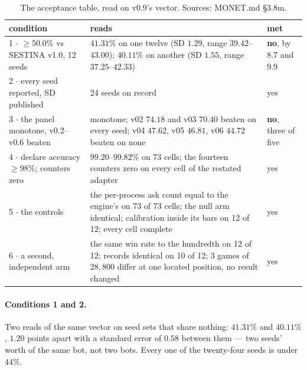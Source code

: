 \documentclass[11pt]{article}
\newcommand{\monet}{MONET.md}
\begin{document}
\begin{table}[t]
\centering\small
\caption{The acceptance table, read on v0.9's vector. Sources: \monet{} \S3.8m.}
\label{tab:accept}
\begin{tabular}{@{}p{}p{}l@{}}
\toprule
condition & reads & met \\
\midrule
1 $\cdot$ $\geq 50.0\%$ vs SESTINA v1.0, 12 seeds & $41.31\%$ on one twelve (SD $1.29$, range $39.42$--$43.00$); $40.11\%$ on another (SD $1.55$, range $37.25$--$42.33$) & \textbf{no}, by 8.7 and 9.9 \\
2 $\cdot$ every seed reported, SD published & 24 seeds on record & yes \\
3 $\cdot$ the panel monotone, v0.2--v0.6 beaten & monotone; v02 $74.18$ and v03 $70.40$ beaten on every seed; v04 $47.62$, v05 $46.81$, v06 $44.72$ beaten on none & \textbf{no}, three of five \\
4 $\cdot$ declare accuracy $\geq 98\%$; counters zero & $99.20$--$99.82\%$ on 73 cells; the fourteen counters zero on every cell of the restated adapter & yes \\
5 $\cdot$ the controls & the per-process ask count equal to the engine's on 73 of 73 cells; the null arm identical; calibration inside its bars on 12 of 12; every cell complete & yes \\
6 $\cdot$ a second, independent arm & the same win rate to the hundredth on 12 of 12; records identical on 10 of 12; 3 games of $28{,}800$ differ at one located position, no result changed & yes \\
\bottomrule
\end{tabular}
\end{table}

\paragraph{Conditions 1 and 2.} Two reads of the same vector on seed sets that share nothing:
$41.31\%$ and $40.11\%$, $1.20$ points apart with a standard error of $0.58$ between them --- two
seeds' worth of the same bot, not two bots. Every one of the twenty-four seeds is under $44\%$.
\end{document}

